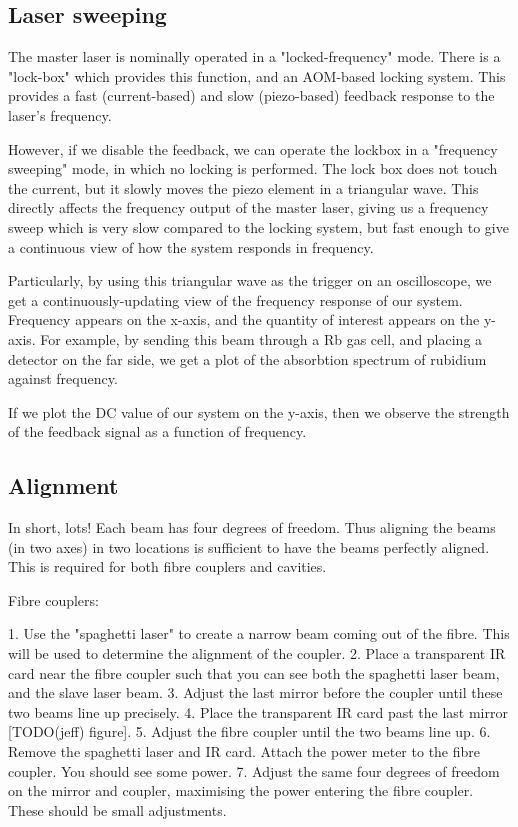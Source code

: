 \subsection{Laser sweeping}

The master laser is nominally operated in a "locked-frequency" mode.  There is a "lock-box" which provides this function, and an AOM-based locking system.  This provides a fast (current-based) and slow (piezo-based) feedback response to the laser's frequency.

However, if we disable the feedback, we can operate the lockbox in a "frequency sweeping" mode, in which no locking is performed.  The lock box does not touch the current, but it slowly moves the piezo element in a triangular wave.  This directly affects the frequency output of the master laser, giving us a frequency sweep which is very slow compared to the locking system, but fast enough to give a continuous view of how the system responds in frequency.

Particularly, by using this triangular wave as the trigger on an oscilloscope, we get a continuously-updating view of the frequency response of our system.  Frequency appears on the x-axis, and the quantity of interest appears on the y-axis.  For example, by sending this beam through a Rb gas cell, and placing a detector on the far side, we get a plot of the absorbtion spectrum of rubidium against frequency.

If we plot the DC value of our system on the y-axis, then we observe the strength of the feedback signal as a function of frequency.

\subsection{Alignment}

In short, lots!  Each beam has four degrees of freedom.  Thus aligning the beams (in two axes) in two locations is sufficient to have the beams perfectly aligned.  This is required for both fibre couplers and cavities.

Fibre couplers:

 1. Use the "spaghetti laser" to create a narrow beam coming out of the fibre.  This will be used to determine the alignment of the coupler.
 2. Place a transparent IR card near the fibre coupler such that you can see both the spaghetti laser beam, and the slave laser beam.
 3. Adjust the last mirror before the coupler until these two beams line up precisely.
 4. Place the transparent IR card past the last mirror [TODO(jeff) figure].
 5. Adjust the fibre coupler until the two beams line up.
 6. Remove the spaghetti laser and IR card.  Attach the power meter to the fibre coupler.  You should see some power.
 7. Adjust the same four degrees of freedom on the mirror and coupler, maximising the power entering the fibre coupler.  These should be small adjustments.

